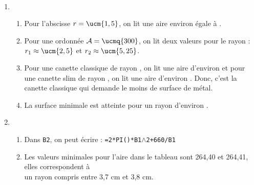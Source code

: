 \ \\ [-5mm]
   \begin{enumerate}
      \item
         \begin{enumerate}
            \item Pour l'abscisse $r =\ucm{1,5}$, on lit une aire environ égale à {\blue {}}.
            \item Pour une ordonnée $\mathcal{A} =\ucmq{300}$, on lit deux valeurs pour le rayon : {\blue $r_1 \approx\ucm{2,5}$ et $r_2 \approx \ucm{5,25}$}.
            \item Pour une canette classique de rayon , on lit une aire d'environ  et pour une canette slim de rayon , on lit une aire d'environ . Donc, {\blue c'est la canette classique qui demande le moins de surface de métal}.
            \item La surface minimale est atteinte pour un rayon d'environ {\blue {}}.
         \end{enumerate}
      \setcounter{enumi}{1}
      \item
         \begin{enumerate}
            \item Dans \texttt{B2}, on peut écrire : {\blue \texttt{=2*PI()*B1$\wedge$2+660/B1}}
            \item Les valeurs minimales pour l'aire dans le tableau sont 264,40 et 264,41, elles correspondent à \\
   {\blue un rayon compris entre 3,7 cm et 3,8 cm.}
         \end{enumerate}
   \end{enumerate}

